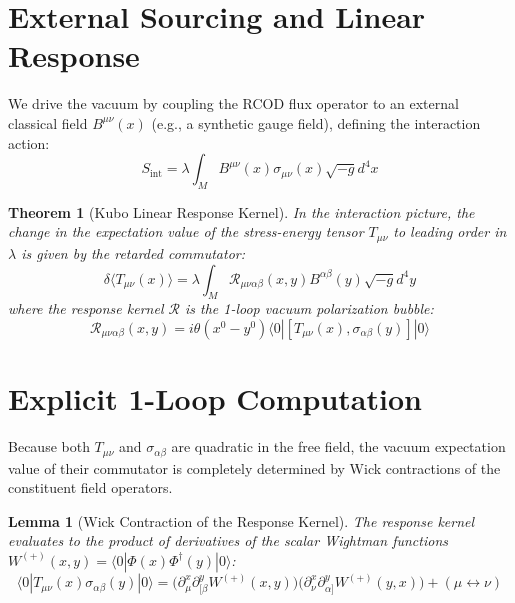 \documentclass[11pt, a4paper]{article}
\newtheorem{theorem}{Theorem}
\newtheorem{lemma}{Lemma}
\begin{document}
\section{External Sourcing and Linear Response}

We drive the vacuum by coupling the RCOD flux operator to an external classical field $B^{\mu\nu}(x)$ (e.g., a synthetic gauge field), defining the interaction action:
\begin{equation}
    S_{\text{int}} = \lambda \int_M B^{\mu\nu}(x) \sigma_{\mu\nu}(x) \sqrt{-g} d^4x
\end{equation}

\begin{theorem}[Kubo Linear Response Kernel]
In the interaction picture, the change in the expectation value of the stress-energy tensor $T_{\mu\nu}$ to leading order in $\lambda$ is given by the retarded commutator:
\begin{equation}
    \delta \langle T_{\mu\nu}(x) \rangle = \lambda \int_M \mathcal{R}_{\mu\nu\alpha\beta}(x,y) B^{\alpha\beta}(y) \sqrt{-g} d^4y
\end{equation}
where the response kernel $\mathcal{R}$ is the 1-loop vacuum polarization bubble:
\begin{equation}
    \mathcal{R}_{\mu\nu\alpha\beta}(x,y) = i \theta(x^0 - y^0) \langle 0 | [T_{\mu\nu}(x), \sigma_{\alpha\beta}(y)] | 0 \rangle
\end{equation}
\end{theorem}

\section{Explicit 1-Loop Computation}

Because both $T_{\mu\nu}$ and $\sigma_{\alpha\beta}$ are quadratic in the free field, the vacuum expectation value of their commutator is completely determined by Wick contractions of the constituent field operators.

\begin{lemma}[Wick Contraction of the Response Kernel]
The response kernel evaluates to the product of derivatives of the scalar Wightman functions $W^{(+)}(x,y) = \langle 0 | \Phi(x) \Phi^\dagger(y) | 0 \rangle$:
\begin{equation}
    \langle 0 | T_{\mu\nu}(x) \sigma_{\alpha\beta}(y) | 0 \rangle = \Big( \partial_\mu^x \partial_{[\beta}^y W^{(+)}(x,y) \Big) \Big( \partial_\nu^x \partial_{\alpha]}^y W^{(+)}(y,x) \Big) + (\mu \leftrightarrow \nu)
\end{equation}
\end{lemma}
\end{document}
